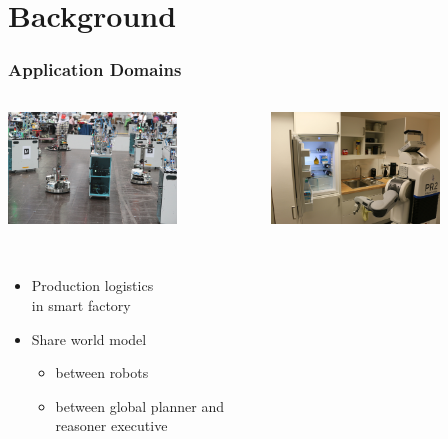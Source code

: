 \section{Background}
\begin{frame}
  \frametitle{Application Domains}
  \begin{columns}
    \begin{column}{0.5\textwidth}
    \begin{flushleft}
    \includegraphics[width=0.7\textwidth]{../thesis/img/rcll-feld}
    \end{flushleft}
  \begin{description}[]
  \item[RoboCup Logistics League] \hfill \\
    \begin{itemize}
    \item Production logistics\\ in smart factory
    \item Share world model
    \begin{itemize}
    \item between robots
    \item between global planner and reasoner executive
    \end{itemize}
    \end{itemize}
  \end{description}
    \end{column}
    \begin{column}{0.5\textwidth}
    \begin{flushright}
    \includegraphics[width=0.7\textwidth]{../thesis/img/pr2-kbsg-kitchen}

\end{flushright}
\end{column}
\end{columns}
\end{frame}
